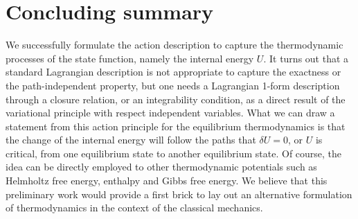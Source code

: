 \documentclass[12pt]{article}
\numberwithin{equation}{section}
\theoremstyle{remark}
\theoremstyle{definition}
\begin{document}
\section{Concluding summary}\label{SS}
We successfully formulate the action description to capture the thermodynamic processes of the state function, namely the internal energy $U$. It turns out that a standard Lagrangian description is not appropriate to capture the exactness or the path-independent property, but one needs a Lagrangian 1-form description through a closure relation, or an integrability condition, as a direct result of the variational principle with respect independent variables. What we can draw a statement from this action principle for the equilibrium thermodynamics is that the change of the internal energy will follow the paths that $\delta U=0$, or $U$ is critical, from one equilibrium state to another equilibrium state. Of course, the idea can be directly employed to other thermodynamic potentials such as Helmholtz free energy, enthalpy and Gibbs free energy. We believe that this preliminary work would provide a first brick to lay out an alternative formulation of thermodynamics in the context of the classical mechanics.
\end{document}
